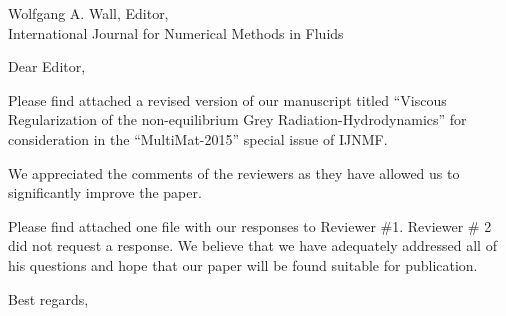 
        \addtolength{\topmargin}{-4.0cm}    %
       \addtolength{\textheight}{7.5cm}    %

\address{Jean Ragusa\\ 
Department of Nuclear Engineering \\
Texas A\&M University\\
College Station, TX 77843-3133, USA\\
phone: (979) 862 2033\\
e-mail: jean.ragusa@tamu.edu \vspace{0.5cm}}


\signature{\vspace{-1.25cm}Marc-Olivier Delchini, Jean Ragusa, Jim Ferguson}   




\begin{letter}{
    Wolfgang A. Wall, Editor,\\
    International Journal for Numerical Methods in Fluids}
\date{\today}

\opening{Dear Editor,}
         \vspace{0.25cm}

Please find attached a revised version of our manuscript titled ``Viscous Regularization of the non-equilibrium Grey Radiation-Hydrodynamics'' for consideration in the ``MultiMat-2015'' special issue of IJNMF. 

We appreciated the comments of the reviewers as they have allowed us to significantly improve the paper.


Please find attached one file with our responses to Reviewer \#1. Reviewer \# 2 did not request a response. We believe that we have adequately addressed all of his questions and hope that our paper will be found suitable for publication.




\closing{Best regards, }

\end{letter}


